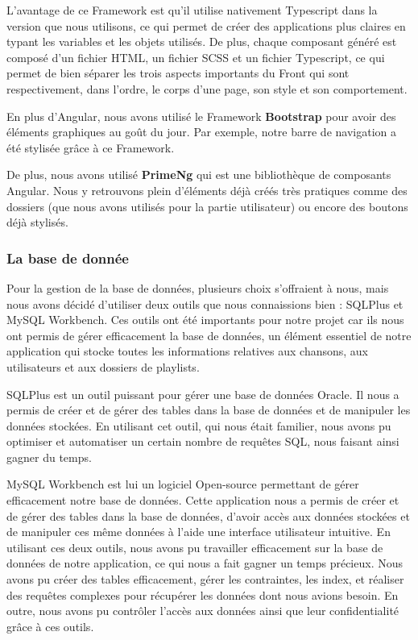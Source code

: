 \documentclass[12pt,french]{article}
\begin{document}
\medskip

L'avantage de ce \gls{Framework} est qu'il utilise nativement \gls{Typescript} dans la version que nous utilisons, ce qui permet de créer des applications plus claires en typant les variables et les objets utilisés. De plus, chaque composant généré est composé d'un fichier \gls{HTML}, un fichier \gls{SCSS} et un fichier \gls{Typescript}, ce qui permet de bien séparer les trois aspects importants du \gls{Front} qui sont respectivement, dans l'ordre, le corps d'une page, son style et son comportement.

\bigskip

En plus d'Angular, nous avons utilisé le \gls{Framework} \textbf{Bootstrap} pour avoir des éléments graphiques au goût du jour. Par exemple, notre barre de navigation a été stylisée grâce à ce \gls{Framework}.

De plus, nous avons utilisé \textbf{PrimeNg} qui est une bibliothèque de composants Angular. Nous y retrouvons plein d'éléments déjà créés très pratiques comme des dossiers (que nous avons utilisés pour la partie utilisateur) ou encore des boutons déjà stylisés.

\subsubsection{La base de donnée}

Pour la gestion de la base de données, plusieurs choix s'offraient à nous, mais nous avons décidé d'utiliser deux outils que nous connaissions bien : SQLPlus et MySQL Workbench. Ces outils ont été importants pour notre projet car ils nous ont permis de gérer efficacement la base de données, un élément essentiel de notre application qui stocke toutes les informations relatives aux chansons, aux utilisateurs et aux dossiers de playlists.
\newline

SQLPlus est un outil puissant pour gérer une base de données Oracle. Il nous a permis de créer et de gérer des \gls{table}s dans la base de données et de manipuler les données stockées. En utilisant cet outil, qui nous était familier, nous avons pu optimiser et automatiser un certain nombre de requêtes \gls{SQL}, nous faisant ainsi gagner du temps.
\newline

MySQL Workbench est lui un logiciel \gls{Open-source} permettant de gérer efficacement notre base de données. Cette application nous a permis de créer et de gérer des \gls{table}s dans la base de données, d'avoir accès aux données stockées et de manipuler ces même données à l'aide une interface utilisateur intuitive.
\newline
En utilisant ces deux outils, nous avons pu travailler efficacement sur la base de données de notre application, ce qui nous a fait gagner un temps précieux. Nous avons pu créer des \gls{table}s efficacement, gérer les contraintes, les index, et réaliser des requêtes complexes pour récupérer les données dont nous avions besoin. En outre, nous avons pu contrôler l'accès aux données ainsi que leur confidentialité grâce à ces outils.
\end{document}
